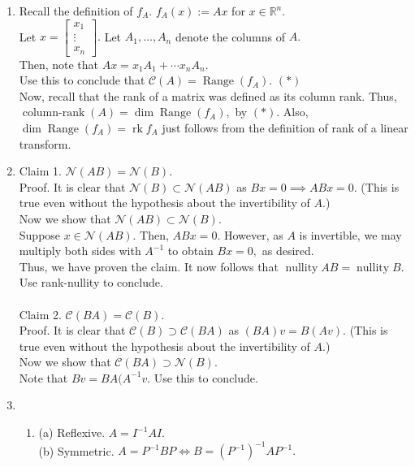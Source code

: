 \documentclass{article}
\newcommand{\nullity}{\operatorname{nullity}}
\begin{document}
\begin{enumerate} 
	\itemsep1em
	\item Recall the definition of $f_A.$ $f_A(x) := Ax$ for $x \in \mathbb{R}^n.$\\
	Let $x = \begin{bmatrix}
		x_1\\
		\vdots\\
		x_n
	\end{bmatrix}.$ Let $A_1, \ldots, A_n$ denote the columns of $A.$ \\
	Then, note that $Ax = x_1A_1 + \cdots x_nA_n.$\\
	Use this to conclude that $\mathcal{C}(A) = \operatorname{Range}(f_A).$ \hfill $(*)$\\
	Now, recall that the rank of a matrix was defined as its column rank. Thus, $\operatorname{column-rank}(A) = \dim \operatorname{Range}(f_A),$ by $(*).$ Also, $\dim \operatorname{Range}(f_A) = \operatorname{rk}f_A$ just follows from the definition of rank of a linear transform.
	\item Claim 1. $\mathcal{N}(AB) = \mathcal{N}(B).$\\
	Proof. It is clear that $\mathcal{N}(B) \subset \mathcal{N}(AB)$ as $Bx = 0 \implies ABx = 0.$ (This is true even without the hypothesis about the invertibility of $A.$)\\
	Now we show that $\mathcal{N}(AB) \subset \mathcal{N}(B).$\\
	Suppose $x \in \mathcal{N}(AB).$ Then, $ABx = 0.$ However, as $A$ is invertible, we may multiply both sides with $A^{-1}$ to obtain $Bx = 0,$ as desired.\\
	Thus, we have proven the claim. It now follows that $\nullity AB = \nullity B.$ Use rank-nullity to conclude.\\~\\
	Claim 2. $\mathcal{C}(BA) = \mathcal{C}(B).$ \\
	Proof. It is clear that $\mathcal{C}(B) \supset \mathcal{C}(BA)$ as $(BA)v = B(Av).$ (This is true even without the hypothesis about the invertibility of $A.$)\\
	Now we show that $\mathcal{C}(BA) \supset \mathcal{N}(B).$\\
	Note that $Bv = BA(A^{-1}v.$ Use this to conclude.
	\item 
	\begin{enumerate}[label = (\roman*)] 
		\item (a) Reflexive. $A = I^{-1}AI.$\\
		(b) Symmetric. $A = P^{-1}BP \iff B = (P^{-1})^{-1} A P^{-1}.$\\

\end{enumerate}
\end{enumerate}
\end{document}
